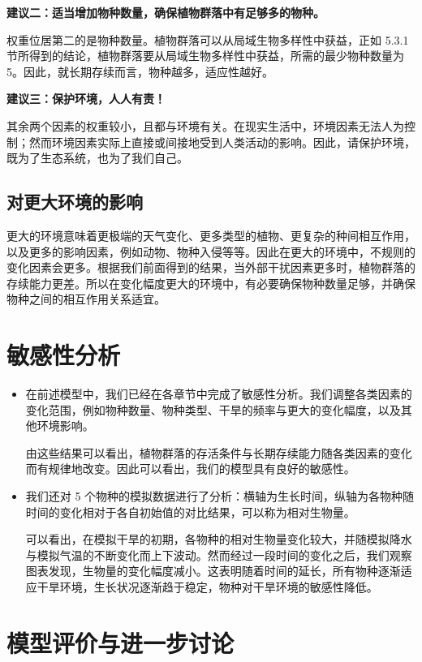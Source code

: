 \documentclass[11pt,a4paper]{ctexart}
\begin{document}
\textbf{建议二：适当增加物种数量，确保植物群落中有足够多的物种。}

权重位居第二的是物种数量。植物群落可以从局域生物多样性中获益，正如 5.3.1 节所得到的结论，植物群落要从局域生物多样性中获益，所需的最少物种数量为 5。因此，就长期存续而言，物种越多，适应性越好。

\textbf{建议三：保护环境，人人有责！}

其余两个因素的权重较小，且都与环境有关。在现实生活中，环境因素无法人为控制；然而环境因素实际上直接或间接地受到人类活动的影响。因此，请保护环境，既为了生态系统，也为了我们自己。

\subsection{对更大环境的影响}

更大的环境意味着更极端的天气变化、更多类型的植物、更复杂的种间相互作用，以及更多的影响因素，例如动物、物种入侵等等。因此在更大的环境中，不规则的变化因素会更多。根据我们前面得到的结果，当外部干扰因素更多时，植物群落的存续能力更差。所以在变化幅度更大的环境中，有必要确保物种数量足够，并确保物种之间的相互作用关系适宜。

\section{敏感性分析}

\begin{itemize}
\item 在前述模型中，我们已经在各章节中完成了敏感性分析。我们调整各类因素的变化范围，例如物种数量、物种类型、干旱的频率与更大的变化幅度，以及其他环境影响。

由这些结果可以看出，植物群落的存活条件与长期存续能力随各类因素的变化而有规律地改变。因此可以看出，我们的模型具有良好的敏感性。

\item 我们还对 5 个物种的模拟数据进行了分析：横轴为生长时间，纵轴为各物种随时间的变化相对于各自初始值的对比结果，可以称为相对生物量。

可以看出，在模拟干旱的初期，各物种的相对生物量变化较大，并随模拟降水与模拟气温的不断变化而上下波动。然而经过一段时间的变化之后，我们观察图表发现，生物量的变化幅度减小。这表明随着时间的延长，所有物种逐渐适应干旱环境，生长状况逐渐趋于稳定，物种对干旱环境的敏感性降低。
\end{itemize}

\section{模型评价与进一步讨论}
\end{document}
